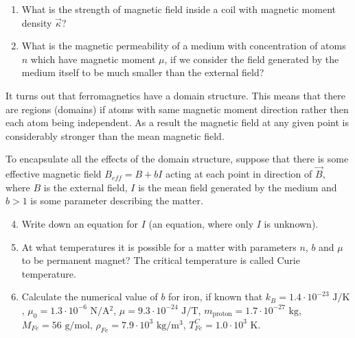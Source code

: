 \begin{enumerate}
\begin{enumerate}
    \item What is the strength of magnetic field inside a coil
        with magnetic moment density $\vec{\kappa}$?

    \item What is the magnetic permeability of a medium
        with concentration of atoms $n$ which have magnetic moment $\mu$,
        if we consider the field generated by the medium itself
        to be much smaller than the external field?
\end{enumerate}

It turns out that ferromagnetics have a domain structure.
This means that there are regions (domains) if atoms
with same magnetic moment direction
rather then each atom being independent.
As a result the magnetic field at any given point
is considerably stronger than the mean magnetic field.

\hspace{.5cm}
To encapsulate all the effects of the domain structure,
suppose that there is some effective magnetic field
$B_{eff} = B + b I$ acting at each point in direction of $\vec{B}$,
where $B$ is the external field,
$I$ is the mean field generated by the medium
and $b > 1$ is some parameter describing the matter.

\begin{enumerate}
    \setcounter{enumii}{3}
    \item Write down an equation for $I$
        (an equation, where only $I$ is unknown).

    \item At what temperatures it is possible for a matter with parameters
        $n$, $b$ and $\mu$ to be permanent magnet?
        The critical temperature is called Curie temperature.

    \item Calculate the numerical value of $b$ for iron, if known that
    $k_B = 1.4 \cdot 10^{-23} \text{ J/K}$,
    $\mu_0 = 1.3 \cdot 10^{-6} \text{ N/A$^2$}$,
    $\mu = 9.3 \cdot 10^{-24} \text{ J/T}$,
    $m_{\text{proton}} = 1.7 \cdot 10^{-27} \text{ kg}$,
    $M_{Fe} = 56 \text{ g/mol}$,
    $\rho_{Fe} = 7.9 \cdot 10^3 \text{ kg/m$^3$}$,
    $T_{Fe}^C = 1.0 \cdot 10^3 \text{ K}$.
\end{enumerate}

\end{enumerate}

